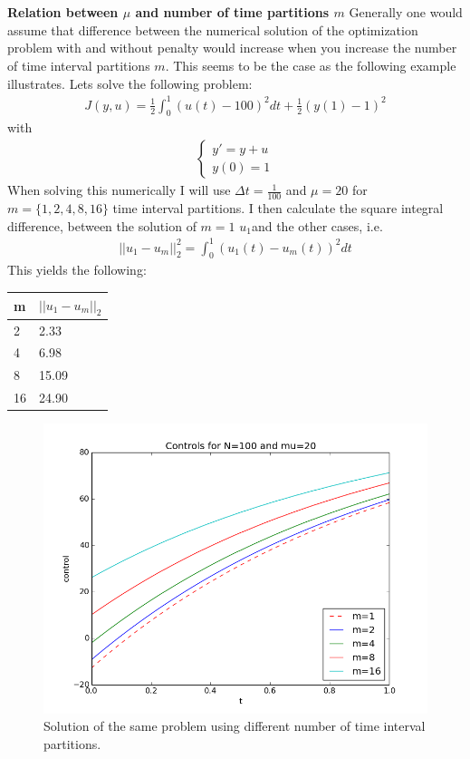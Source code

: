 \documentclass[11pt,a4paper]{report}
\begin{document}
\\
\\
\textbf{Relation between $\mu$ and number of time partitions $m$}
Generally one would assume that difference between the numerical solution of the optimization problem with and without penalty would increase when you increase the number of time interval partitions $m$. This seems to be the case as the following example illustrates. Lets solve the following problem:
\begin{align*}
J(y,u) =\frac{1}{2} \int_0^1 (u(t)-100)^2dt + \frac{1}{2}(y(1)-1)^2
\end{align*}  
with 
\begin{align*}
\left\{
     \begin{array}{lr}
       	y' =  y +u\\
       	   y(0)=1
     \end{array}
   \right.
\end{align*}
When solving this numerically I will use $\Delta t= \frac{1}{100}$ and $\mu=20$ for $m=\{1,2,4,8,16\}$ time interval partitions. I then calculate the square integral difference, between the solution of $m=1$ $u_1$and the other cases, i.e.
\begin{align*}
||u_1-u_m||_2^2 = \int_0^1 (u_1(t)-u_m(t))^2dt
\end{align*} 
This yields the following:
\begin{center}
    \begin{tabular}{| l | l |}
    \hline
    m & $ ||u_1-u_m||_2$ \\ \hline
    2 & 2.33\\ \hline
    4 & 6.98\\ \hline
    8 & 15.09\\ \hline
    16 & 24.90 \\ \hline
    \end{tabular}
\end{center}
\begin{figure}
  \includegraphics[width=\linewidth]{m_plots.png}
  \caption{Solution of the same problem using different number of time interval partitions.}
  \label{Fig 6}
\end{figure}
\end{document}
